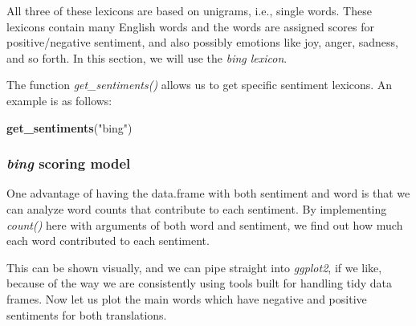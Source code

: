 \documentclass[
]{article}
\newenvironment{Shaded}{\begin{snugshade}}{\end{snugshade}}
\newcommand{\FunctionTok}[1]{\textcolor[rgb]{0.13,0.29,0.53}{\textbf{#1}}}
\newcommand{\NormalTok}[1]{#1}
\newcommand{\StringTok}[1]{\textcolor[rgb]{0.31,0.60,0.02}{#1}}
\begin{document}
All three of these lexicons are based on unigrams, i.e., single words. These lexicons contain many English words and the words are assigned scores for positive/negative sentiment, and also possibly emotions like joy, anger, sadness, and so forth. In this section, we will use the \emph{bing lexicon}.

The function \emph{get\_sentiments()} allows us to get specific sentiment lexicons. An example is as follows:

\footnotesize

\begin{Shaded}
\begin{Highlighting}[]
\FunctionTok{get\_sentiments}\NormalTok{(}\StringTok{"bing"}\NormalTok{)}
\end{Highlighting}
\end{Shaded}

\normalsize

\hypertarget{bing-scoring-model}{%
\subsubsection{\texorpdfstring{\emph{bing} scoring model}{bing scoring model}}\label{bing-scoring-model}}

One advantage of having the data.frame with both sentiment and word is that we can analyze word counts that contribute to each sentiment. By implementing \emph{count()} here with arguments of both word and sentiment, we find out how much each word contributed to each sentiment.

This can be shown visually, and we can pipe straight into \emph{ggplot2}, if we like, because of the way we are consistently using tools built for handling tidy data frames. Now let us plot the main words which have negative and positive sentiments for both translations.
\end{document}
